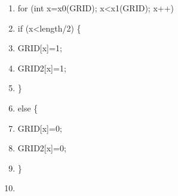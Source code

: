 \documentclass[10pt]{article}
\begin{document}
\begin{shadebox}
\begin{enumerate}
\item for (int x=x0(GRID); x\textless x1(GRID); x++)
\item \hspace{10pt}        if (x\textless length/2) \{
\item \hspace{10pt} \hspace{10pt}                GRID[x]=1;
\item \hspace{10pt} \hspace{10pt}                GRID2[x]=1;
\item \hspace{10pt}        \}
\item \hspace{10pt}        else \{
\item \hspace{10pt} \hspace{10pt}               GRID[x]=0;
\item \hspace{10pt} \hspace{10pt}                GRID2[x]=0;
\item \hspace{10pt}        \}
\item 
\end{enumerate}
\end{shadebox}
\end{document}
